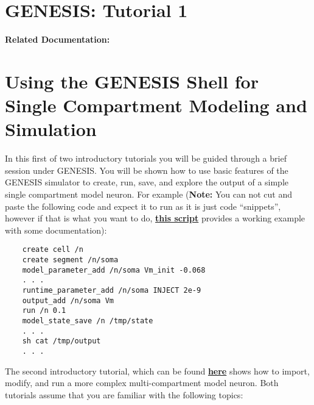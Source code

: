 \documentclass[12pt]{article}
\begin{document}
\section*{GENESIS: Tutorial 1}


{\bf Related Documentation:}

\section*{Using the GENESIS Shell for\\Single Compartment Modeling and Simulation}

In this first of two introductory tutorials you will be guided through a brief session under GENESIS. You will be shown how to use basic features of the GENESIS simulator to create, run, save, and explore the output of a simple single compartment model neuron. For example ({\bf Note:} You can not cut and paste the following code and expect it to run as it is just code ``snippets'', however if that is what you want to do, \href{../example-script1/example-script1.tex}{\bf this script} provides a working example with some documentation):

\begin{verbatim}
    create cell /n
    create segment /n/soma
    model_parameter_add /n/soma Vm_init -0.068
    . . .
    runtime_parameter_add /n/soma INJECT 2e-9
    output_add /n/soma Vm
    run /n 0.1
    model_state_save /n /tmp/state
    . . . 
    sh cat /tmp/output
    . . . 
\end{verbatim}
The second introductory tutorial, which can be found \href{../tutorial2/tutorial2.tex}{\bf here} shows how to import, modify, and run a more complex multi-compartment model neuron. Both tutorials assume that you are familiar with the following topics:
\end{document}
